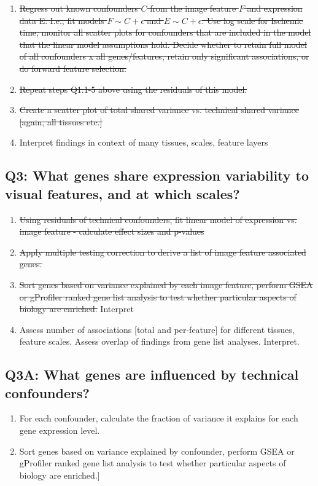 \documentclass{article}
\begin{document}
\begin{enumerate}
\item \sout{Regress out known confounders $C$ from the image feature $F$ and expression data E. I.e., fit models $F \sim C + \epsilon$ and $E \sim C + \epsilon$. Use log scale for Ischemic time, monitor all scatter plots for confounders that are included in the model that the linear model assumptions hold. Decide whether to retain full model of all confounders x all genes/features, retain only significant associations, or do forward feature selection.}

\item \sout{Repeat steps Q1:1-5 above using the residuals of this model. }

\item \sout{Create a scatter plot of total shared variance vs. technical shared variance [again, all tissues etc.]}

\item Interpret findings in context of many tissues, scales, feature layers
\end{enumerate}

\subsection*{Q3: What genes share expression variability to visual features, and at which scales?}
\begin{enumerate}
\item \sout{Using residuals of technical confounders, fit linear model of expression vs. image feature - calculate effect sizes and p-values}

\item \sout{Apply multiple testing correction to derive a list of image feature associated genes.}

\item \sout{Sort genes based on variance explained by each image feature, perform GSEA or gProfiler ranked gene list analysis to test whether particular aspects of biology are enriched.} Interpret

\item Assess number of associations [total and per-feature] for different tissues, feature scales. Assess overlap of findings from gene list analyses. Interpret.
\end{enumerate}

\subsection*{Q3A: What genes are influenced by technical confounders?}
\begin{enumerate}

\item For each confounder, calculate the fraction of variance it explains for each gene expression level. 

\item Sort genes based on variance explained by confounder, perform GSEA or gProfiler ranked gene list analysis to test whether particular aspects of biology are enriched.]

\end{enumerate}
\end{document}
